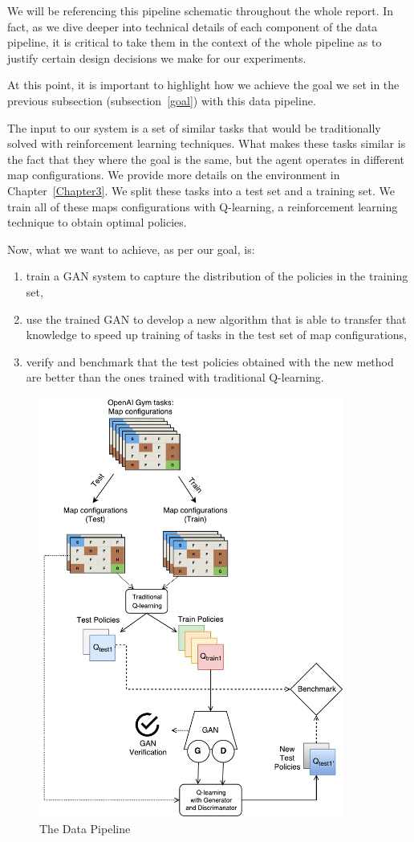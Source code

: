 We will be referencing this pipeline schematic throughout the whole report. In fact, as we dive deeper into technical details of each component of the data pipeline, it is critical to take them in the context of the whole pipeline as to justify certain design decisions we make for our experiments.

At this point, it is important to highlight how we achieve the goal we set in the previous subsection (subsection~\ref{goal}) with this data pipeline.

The input to our system is a set of similar tasks that would be traditionally solved with reinforcement learning techniques. What makes these tasks similar is the fact that they where the goal is the same, but the agent operates in different map configurations. We provide more details on the environment in Chapter~\ref{Chapter3}.
We split these tasks into a test set and a training set. We train all of these maps configurations with Q-learning, a reinforcement learning technique to obtain optimal policies. 

Now, what we want to achieve, as per our goal, is:
\begin{enumerate}
	\item train a GAN system to capture the distribution of the policies in the training set,
	\item use the trained GAN to develop a new algorithm that is able to transfer that knowledge to speed up training of tasks in the test set of map configurations,
	\item verify and benchmark that the test policies obtained with the new method are better than the ones trained with traditional Q-learning.
\end{enumerate}

\begin{figure}
\centering
\includegraphics[width=10cm]{Figures/Pipeline}
\caption{The Data Pipeline}
\label{fig:pipeline}
\end{figure}

